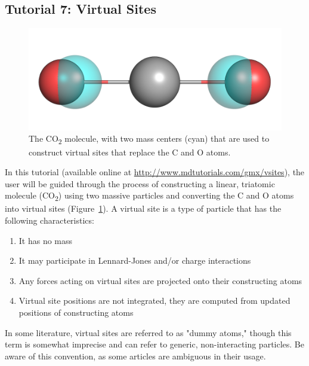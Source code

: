 \documentclass[9pt,tutorial,pubversion]{livecoms}
\newcommand{\urlstring}{http://www.mdtutorials.com/gmx}
\newcommand{\tutorialvsite}{\url{\urlstring/vsites}}
\begin{document}
\subsection{Tutorial 7: Virtual Sites} \label{vsite}

\begin{figure}[H]
\centering
\includegraphics{vsites_co2}
\caption{The CO\textsubscript{2} molecule, with two mass centers (cyan) that are used to construct virtual sites that replace the C and O atoms.}
\label{vsites_co2_fig}
\end{figure}

In this tutorial (available online at \tutorialvsite), the user will be guided through the process of constructing a linear, triatomic molecule (CO\textsubscript{2}) using two massive particles and converting the C and O atoms into virtual sites (Figure~\ref{vsites_co2_fig}). A virtual site is a type of particle that has the following characteristics:

\begin{enumerate}
	\item It has no mass
	\item It may participate in Lennard-Jones and/or charge interactions
	\item Any forces acting on virtual sites are projected onto their constructing atoms
	\item Virtual site positions are not integrated, they are computed from updated positions of constructing atoms
\end{enumerate}

In some literature, virtual sites are referred to as "dummy atoms," though this term is somewhat imprecise and can refer to generic, non-interacting particles. Be aware of this convention, as some articles are ambiguous in their usage.
\end{document}
